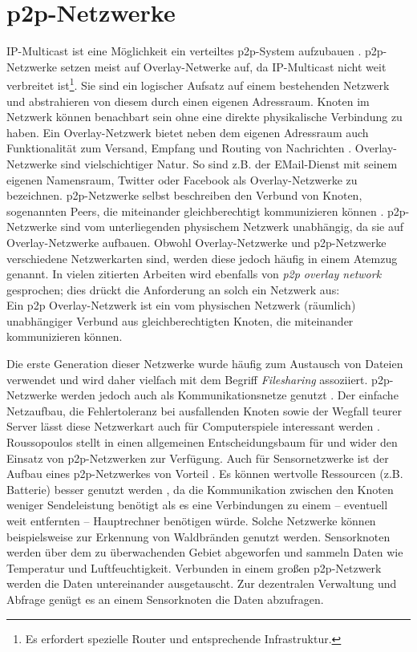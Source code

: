 \section{p2p-Netzwerke}
\label{chap:grundlagen:p2p}

IP-Multicast ist eine Möglichkeit ein verteiltes \ac{p2p}-System aufzubauen \cite{Deering1990Multicast}. \ac{p2p}-Netzwerke setzen meist auf Overlay-Netwerke auf, da IP-Multicast nicht weit verbreitet ist\footnote{Es erfordert spezielle Router und entsprechende Infrastruktur.}. Sie sind ein logischer Aufsatz auf einem bestehenden Netzwerk und abstrahieren von diesem durch einen eigenen Adressraum. Knoten im Netzwerk können benachbart sein ohne eine direkte physikalische Verbindung zu haben. Ein Overlay-Netzwerk bietet neben dem eigenen Adressraum auch Funktionalität zum Versand, Empfang und Routing von Nachrichten \cite{Tannenbaum2003}. Overlay-Netzwerke sind vielschichtiger Natur. So sind z.B. der EMail-Dienst mit seinem eigenen Namensraum, Twitter oder Facebook als Overlay-Netzwerke zu bezeichnen. p2p-Netzwerke selbst beschreiben den Verbund von Knoten, sogenannten Peers, die miteinander gleichberechtigt kommunizieren können \cite{Steinmetz2005}. p2p-Netzwerke sind vom unterliegenden physischem Netzwerk unabhängig, da sie auf Overlay-Netzwerke aufbauen. Obwohl Overlay-Netzwerke und \ac{p2p}-Netzwerke verschiedene Netzwerkarten sind, werden diese jedoch häufig in einem Atemzug genannt. In vielen zitierten Arbeiten wird ebenfalls von \emph{p2p overlay network} gesprochen; dies drückt die Anforderung an solch ein Netzwerk aus:\\
Ein p2p Overlay-Netzwerk ist ein vom physischen Netzwerk (räumlich) unabhängiger Verbund aus gleichberechtigten Knoten, die miteinander kommunizieren können.

Die erste Generation dieser Netzwerke wurde häufig zum Austausch von Dateien verwendet und wird daher vielfach mit dem Begriff \emph{Filesharing} assoziiert. p2p-Netzwerke werden jedoch auch als Kommunikationsnetze genutzt \cite{Darlagiannis2006Peertopeer}. Der einfache Netzaufbau, die Fehlertoleranz bei ausfallenden Knoten sowie der Wegfall teurer Server lässt diese Netzwerkart auch für Computerspiele interessant werden \cite{Knutsson2004Peertopeer, Triebel2008Peertopeer}. Roussopoulos stellt in \cite{Roussopoulos20032} einen allgemeinen Entscheidungsbaum für und wider den Einsatz von p2p-Netzwerken zur Verfügung. Auch für Sensornetzwerke ist der Aufbau eines p2p-Netzwerkes von Vorteil \cite{MuneebAliandKoenLangendoen2007Case}. Es können wertvolle Ressourcen (z.B. Batterie) besser genutzt werden \cite{Sioutas2009Building}, da die Kommunikation zwischen den Knoten weniger Sendeleistung benötigt als es eine Verbindungen zu einem -- eventuell weit entfernten -- Hauptrechner benötigen würde. Solche Netzwerke können beispielsweise zur Erkennung von Waldbränden genutzt werden. Sensorknoten werden über dem zu überwachenden Gebiet abgeworfen und sammeln Daten wie Temperatur und Luftfeuchtigkeit. Verbunden in einem großen p2p-Netzwerk werden die Daten untereinander ausgetauscht. Zur dezentralen Verwaltung und Abfrage genügt es an einem Sensorknoten die Daten abzufragen.

